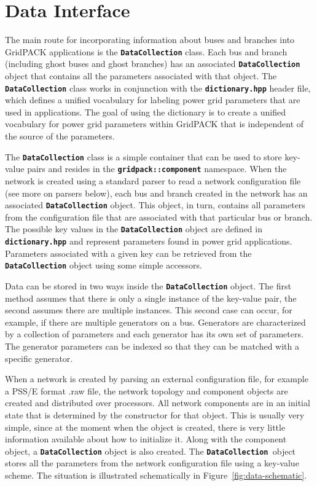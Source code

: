 \section{Data Interface}

The main route for incorporating information about buses and branches into GridPACK applications is the \texttt{\textbf{DataCollection}} class. Each bus and branch (including ghost buses and ghost branches) has an associated \texttt{\textbf{DataCollection}} object that contains all the parameters associated with that object. The \texttt{\textbf{DataCollection}} class works in conjunction with the \texttt{\textbf{dictionary.hpp}} header file, which defines a unified vocabulary for labeling power grid parameters that are used in applications. The goal of using the dictionary is to create a unified vocabulary for power grid parameters within GridPACK that is independent of the source of the parameters.

The \texttt{\textbf{DataCollection}} class is a simple container that can be used to store key-value pairs and resides in the \texttt{\textbf{gridpack::component}} namespace. When the network is created using a standard parser to read a network configuration file (see more on parsers below), each bus and branch created in the network has an associated \texttt{\textbf{DataCollection}} object. This object, in turn, contains all parameters from the configuration file that are associated with that particular bus or branch. The possible key values in the \texttt{\textbf{DataCollection}} object are defined in \texttt{\textbf{dictionary.hpp}} and represent parameters found in power grid applications. Parameters associated with a given key can be retrieved from the \texttt{\textbf{DataCollection}} object using some simple accessors.

Data can be stored in two ways inside the \texttt{\textbf{DataCollection}} object. The first method assumes that there is only a single instance of the key-value pair, the second assumes there are multiple instances. This second case can occur, for example, if there are multiple generators on a bus. Generators are characterized by a collection of parameters and each generator has its own set of parameters. The generator parameters can be indexed so that they can be matched with a specific generator.

When a network is created by parsing an external configuration file, for example
a PSS/E format .raw file, the network topology and component objects are created
and distributed over processors. All network components are in an initial state
that is determined by the constructor for that object. This is usually very
simple, since at the moment when the object is created, there is very little
information available about how to initialize it. Along with the component
object, a \texttt{\textbf{DataCollection}} object is also created. The
\texttt{\textbf{DataCollection }}object stores all the parameters from the
network configuration file using a key-value scheme. The situation is
illustrated schematically in Figure~\ref{fig:data-schematic}.

